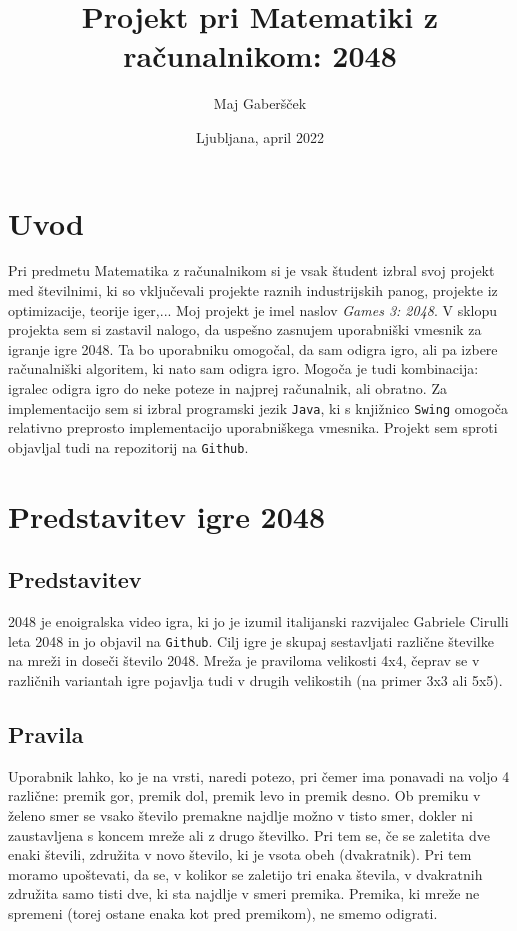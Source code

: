 \documentclass{article}
\title{Projekt pri Matematiki z računalnikom: 2048}
\author{Maj Gaberšček}
\date{Ljubljana, april 2022}
\begin{document}
\maketitle

\section{Uvod}
Pri predmetu Matematika z računalnikom si je vsak študent izbral svoj projekt med številnimi, ki so vključevali projekte raznih industrijskih panog, projekte iz optimizacije, teorije iger,... Moj projekt je imel naslov \emph{Games 3: 2048}. V sklopu projekta sem si zastavil nalogo, da uspešno zasnujem uporabniški vmesnik za igranje igre 2048. Ta bo uporabniku omogočal, da sam odigra igro, ali pa izbere računalniški algoritem, ki nato sam odigra igro. Mogoča je tudi kombinacija: igralec odigra igro do neke poteze in najprej računalnik, ali obratno. Za implementacijo sem si izbral programski jezik \texttt{Java}, ki s knjižnico \texttt{Swing} omogoča relativno preprosto implementacijo uporabniškega vmesnika. Projekt sem sproti objavljal tudi na repozitorij na \texttt{Github}.

\section{Predstavitev igre 2048}

\subsection{Predstavitev}

2048 je enoigralska video igra, ki jo je izumil italijanski razvijalec Gabriele Cirulli leta 2048 in jo objavil na \texttt{Github}. Cilj igre je skupaj sestavljati različne številke na mreži in doseči število 2048. Mreža je praviloma velikosti 4x4, čeprav se v različnih variantah igre pojavlja tudi v drugih velikostih (na primer 3x3 ali 5x5).

\subsection{Pravila}

Uporabnik lahko, ko je na vrsti, naredi potezo, pri čemer ima ponavadi na voljo 4 različne: premik gor, premik dol, premik levo in premik desno. Ob premiku v želeno smer se vsako število premakne najdlje možno v tisto smer, dokler ni zaustavljena s koncem mreže ali z drugo številko. Pri tem se, če se zaletita dve enaki števili, združita v novo število, ki je vsota obeh (dvakratnik). Pri tem moramo upoštevati, da se, v kolikor se zaletijo tri enaka števila, v dvakratnih združita samo tisti dve, ki sta najdlje v smeri premika. Premika, ki mreže ne spremeni (torej ostane enaka kot pred premikom), ne smemo odigrati.
\end{document}
